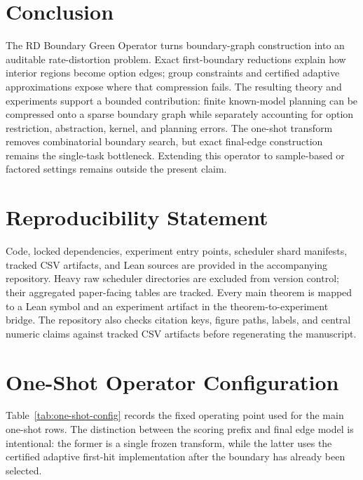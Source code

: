 \documentclass[10pt]{article}
\begin{document}
\section{Conclusion}
The RD Boundary Green Operator turns boundary-graph construction into an
auditable rate-distortion problem. Exact first-boundary reductions explain how
interior regions become option edges; group constraints and certified adaptive
approximations expose where that compression fails. The resulting theory and
experiments support a bounded contribution: finite known-model planning can be
compressed onto a sparse boundary graph while separately accounting for option
restriction, abstraction, kernel, and planning errors. The one-shot transform
removes combinatorial boundary search, but exact final-edge construction remains
the single-task bottleneck. Extending this operator to sample-based or factored
settings remains outside the present claim.

\section*{Reproducibility Statement}
Code, locked dependencies, experiment entry points, scheduler shard manifests,
tracked CSV artifacts, and Lean sources are provided in the accompanying
repository. Heavy raw scheduler directories are excluded from version control;
their aggregated paper-facing tables are tracked. Every main theorem is mapped
to a Lean symbol and an experiment artifact in the theorem-to-experiment bridge.
The repository also checks citation keys, figure paths, labels, and central
numeric claims against tracked CSV artifacts before regenerating the manuscript.

\appendix

\section{One-Shot Operator Configuration}
\label{app:configuration}
Table~\ref{tab:one-shot-config} records the fixed operating point used for the
main one-shot rows. The distinction between the scoring prefix and final edge
model is intentional: the former is a single frozen transform, while the latter
uses the certified adaptive first-hit implementation after the boundary has
already been selected.
\end{document}
